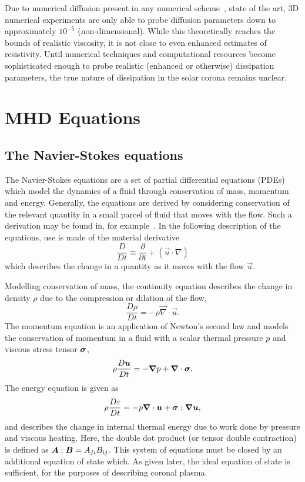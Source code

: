 Due to numerical diffusion present in any numerical scheme~\cite{ferzigerComputationalMethodsFluid2002}, state of the art, 3D numerical experiments are only able to probe diffusion parameters down to approximately $10^{-5}$ (non-dimensional). While this theoretically reaches the bounds of realistic viscosity, it is not close to even enhanced estimates of resistivity. Until numerical techniques and computational resources become sophisticated enough to probe realistic (enhanced or otherwise) dissipation parameters, the true nature of dissipation in the solar corona remains unclear.

\section{MHD Equations}

\subsection{The Navier-Stokes equations}

The Navier-Stokes equations are a set of partial differential equations (PDEs) which model the dynamics of a fluid through conservation of mass, momentum and energy. Generally, the equations are derived by considering conservation of the relevant quantity in a small parcel of fluid that moves with the flow. Such a derivation may be found in, for example~\cite{andersonComputationalFluidDynamics1995}. In the following description of the equations, use is made of the material derivative
\begin{equation}
  \label{eq:material_derivative}
  \frac{D}{Dt} \equiv \frac{\partial}{\partial t} + (\vec{u} \cdot \nabla)
\end{equation}
which describes the change in a quantity as it moves with the flow $\vec{u}$.

Modelling conservation of mass, the continuity equation describes the change in density $\rho$ due to the compression or dilation of the flow,
\begin{equation}
\frac{D\rho}{Dt} = - \rho \vec{\nabla} \cdot \vec{u}.
\label{eq:ns_continuity}
\end{equation}
The momentum equation is an application of Newton's second law and models the conservation of momentum in a fluid with a scalar thermal pressure $p$ and viscous stress tensor ${\bm \sigma}$,
\begin{equation}
\rho\frac{D{\bm u}}{Dt} = -{\bm \nabla} p + {\bm \nabla} \cdot {\bm \sigma}.
\label{eq:ns_momentum}
\end{equation}
The energy equation is given as
\begin{equation}
\rho\frac{D\varepsilon}{Dt} = -p {\bm \nabla} \cdot {\bm u} + {\bm \sigma} : {\bm \nabla}{\bm u},
\label{eq:ns_energy}
\end{equation}
and describes the change in internal thermal energy due to work done by pressure and viscous heating. Here, the double dot product (or tensor double contraction) is defined as ${\bm A}:{\bm B} = A_{ji} B_{ij}$. This system of equations must be closed by an additional equation of state which. As given later, the ideal equation of state is sufficient, for the purposes of describing coronal plasma.

